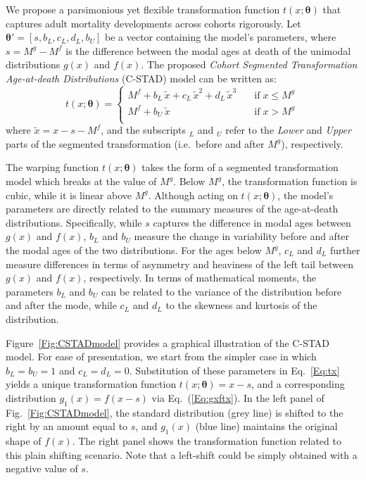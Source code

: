 \documentclass[11pt, a4paper]{article}
\begin{document}
We propose a parsimonious yet flexible transformation function $t(x;\bm{\theta})$ that captures adult mortality developments across cohorts rigorously. Let $\bm{\theta}' = \left[s,b_{L},c_{L},d_{L},b_{U}\right]$ be a vector containing the model's parameters, where $s = M^{g} - M^{f}$ is the difference between the modal ages at death of the unimodal distributions $g(x)$ and $f(x)$. The proposed \emph{Cohort Segmented Transformation Age-at-death Distributions} (C-STAD) model can be written as: 
%
\begin{equation}\label{Eq:tx}
t(x;\bm{\theta}) = \left\{ \begin{array}{ll}
M^{f} + b_{L}\,\tilde{x} + c_{L}\,\tilde{x}^2 + d_{L}\,\tilde{x}^3 \quad & \mathrm{if} \; x \leq M^{g} \, \\
M^{f} + b_{U}\,\tilde{x} \quad & \mathrm{if} \; x > M^{g} \\
\end{array}
\right.
\end{equation} 
%
where $\tilde{x}=x - s - M^{f}$, and the subscripts $_L$ and $_U$ refer to the \textit{Lower} and \textit{Upper} parts of the segmented transformation (i.e.~before and after $M^{g}$), respectively. \par

The warping function $t(x;\bm{\theta})$ takes the form of a segmented transformation model which breaks at the value of $M^{g}$. Below $M^{g}$, the transformation function is cubic, while it is linear above $M^{g}$. Although acting on $t(x;\bm{\theta})$, the model's parameters are directly related to the summary measures of the age-at-death distributions. Specifically, while $s$ captures the difference in modal ages between $g(x)$ and $f(x)$, $b_L$ and $b_U$ measure the change in variability before and after the modal ages of the two distributions. For the ages below $M^{g}$, $c_L$ and $d_L$ further measure differences in terms of asymmetry and heaviness of the left tail between $g(x)$ and $f(x)$, respectively. In terms of mathematical moments, the parameters $b_L$ and $b_U$ can be related to the variance of the distribution before and after the mode, while $c_L$ and $d_L$ to the skewness and kurtosis of the distribution. \par

Figure~\ref{Fig:CSTADmodel} provides a graphical illustration of the C-STAD model. For ease of presentation, we start from the simpler case in which $b_L = b_U = 1$ and $c_L = d_L = 0$. Substitution of these parameters in Eq.~\eqref{Eq:tx} yields a unique transformation function $t(x;\bm{\theta})=x-s$, and a corresponding distribution $g_1(x) = f(x-s)$ via Eq.~(\ref{Eq:gxftx}). In the left panel of Fig.~\ref{Fig:CSTADmodel}, the standard distribution (grey line) is shifted to the right by an amount equal to $s$, and $g_1(x)$ (blue line) maintains the original shape of $f(x)$. The right panel shows the transformation function related to this plain shifting scenario. Note that a left-shift could be simply obtained with a negative value of $s$. \par
\end{document}
